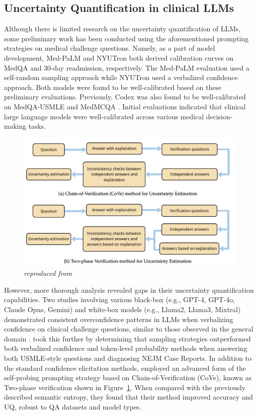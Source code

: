 \subsection{Uncertainty Quantification in clinical LLMs}
Although there is limited research on the uncertainty quantification of LLMs, some preliminary work has been conducted using the aforementioned prompting strategies on medical challenge questions. Namely, as a part of model development, Med-PaLM \citep{singhalLargeLanguageModels2023} and NYUTron \citep{jiangHealthSystemscaleLanguage2023} both derived calibration curves on MedQA and 30-day readmission, respectively. The Med-PaLM evaluation used a self-random sampling approach while NYUTron used a verbalized confidence approach. Both models were found to be well-calibrated based on these preliminary evaluations. Previously, Codex was also found to be well-calibrated on MedQA-USMLE and MedMCQA \citep{lievinCanLargeLanguage2024a}. Initial evaluations indicated that clinical large language models were well-calibrated across various medical decision-making tasks. 

\begin{figure}[htbp]
	\centering
	\includegraphics[width=1\linewidth] {figures/cove.png}
	\caption{\emph{reproduced from \citet{wuUncertaintyEstimationLarge2024}}} \label{fig:CoVe}
\end{figure}

However, more thorough analysis revealed gaps in their uncertainty quantification capabilities. Two studies involving various black-box (e.g., GPT-4, GPT-4o, Claude Opus, Gemini) and white-box models (e.g., Llama2, Llama3, Mixtral) demonstrated consistent overconfidence patterns in LLMs when verbalizing confidence on clinical challenge questions, similar to those observed in the general domain \citet{omarBenchmarkingConfidenceLarge2024, savageLargeLanguageModel2024}. \citet{savageLargeLanguageModel2024} took this further by determining that sampling strategies outperformed both verbalized confidence and token-level probability methods when answering both USMLE-style questions and diagnosing NEJM Case Reports. In addition to the standard confidence elicitation methods, \citet{wuUncertaintyEstimationLarge2024} employed an advanced form of the self-probing prompting strategy based on Chain-of-Verification (CoVe), known as Two-phase verification shown in Figure~\ref{fig:CoVe}. When compared with the previously described semantic entropy, they found that their method improved accuracy and UQ, robust to QA datasets and model types. 

